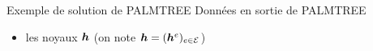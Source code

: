 \begin{frame}{Exemple de solution de PALMTREE}
Données en sortie de PALMTREE
\begin{itemize}
	\item les \alert{noyaux} $\bm{h}$ (on note $\bm{h} = (\bm{h}^e)_{e \in \mathcal E}$)
\end{itemize}
\begin{figure}\centering
{}
\end{figure}
\end{frame}


